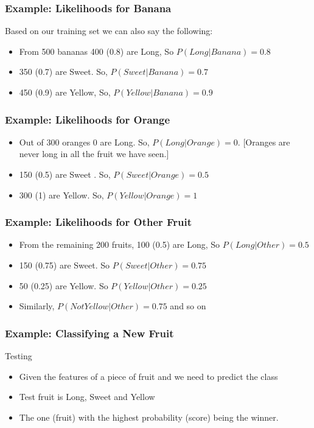 \begin{frame}[fragile]\frametitle{Example: Likelihoods for Banana}
Based on our training set we can also say the following:
\begin{itemize}
\item From 500 bananas 400 (0.8) are Long, So $P(Long|Banana) = 0.8$
\item 350 (0.7) are Sweet. So, $P(Sweet|Banana) = 0.7$
\item 450 (0.9) are Yellow, So, $P(Yellow|Banana) = 0.9$
\end{itemize}
\end{frame}

\begin{frame}[fragile]\frametitle{Example: Likelihoods for Orange}
\begin{itemize}
\item Out of 300 oranges 0 are Long. So, $P(Long|Orange) = 0$. [Oranges are never long in all the fruit we have seen.]
\item 150 (0.5) are Sweet . So, $P(Sweet|Orange) = 0.5$
\item 300 (1) are Yellow.  So, $P(Yellow|Orange) = 1$
\end{itemize}
\end{frame}


\begin{frame}[fragile]\frametitle{Example: Likelihoods for Other Fruit}
\begin{itemize}
\item From the remaining 200 fruits, 100 (0.5) are Long,  So $P(Long|Other) = 0.5$
\item 150 (0.75) are Sweet.  So $P(Sweet|Other) = 0.75$
\item 50 (0.25) are Yellow.  So $P(Yellow|Other) = 0.25$
\item Similarly, $P(Not Yellow|Other) = 0.75$ and so on
\end{itemize}
\end{frame}




\begin{frame}[fragile]\frametitle{Example: Classifying a New Fruit}
Testing
\begin{itemize}
\item Given the features of a piece of fruit and we need to predict the class
\item Test fruit is Long, Sweet and Yellow
\item The one (fruit) with the highest probability (score) being the winner.
\end{itemize}

\end{frame}

